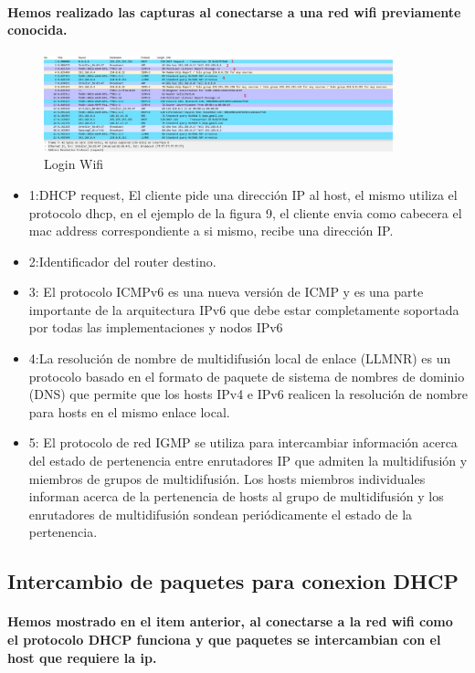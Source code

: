 \documentclass[letterpaper]{article}
\begin{document}
\paragraph{Hemos realizado las capturas al conectarse a una red wifi previamente conocida. }

\begin{figure}[h]
	\includegraphics[width=0.9\textwidth]{img/login-wifi-1.jpg}
	\caption{Login Wifi }
	\label{figura 9}
\end{figure}

\begin{itemize}


\subsubsection{Explicación}
				
		\item{1:DHCP request, El cliente pide una dirección IP al host, el mismo utiliza el protocolo dhcp, en el ejemplo de la figura 9, el cliente envia como cabecera el mac address correspondiente a si mismo, recibe una dirección IP.}

\item{2:Identificador del router destino.}
\item{3: El protocolo ICMPv6  es una nueva versión de ICMP y es una parte importante de la arquitectura IPv6 que debe estar completamente soportada por todas las implementaciones y nodos IPv6}
\item{4:La resolución de nombre de multidifusión local de enlace (LLMNR) es un protocolo basado en el formato de paquete de sistema de nombres de dominio (DNS) que permite que los hosts IPv4 e IPv6 realicen la resolución de nombre para hosts en el mismo enlace local.}
\item{5: El protocolo de red IGMP se utiliza para intercambiar información acerca del estado de pertenencia entre enrutadores IP que admiten la multidifusión y miembros de grupos de multidifusión. Los hosts miembros individuales informan acerca de la pertenencia de hosts al grupo de multidifusión y los enrutadores de multidifusión sondean periódicamente el estado de la pertenencia.}


				\end{itemize}
\subsection{Intercambio de paquetes para conexion DHCP}
\paragraph{Hemos mostrado en el item anterior, al conectarse a la red wifi como el protocolo DHCP funciona y que paquetes se intercambian con el host que requiere la ip.}
\end{document}
